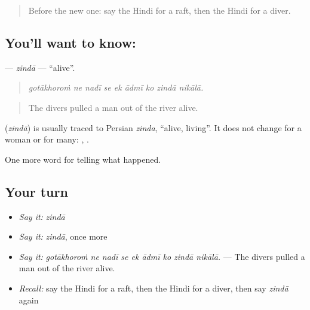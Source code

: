 \label{lesson:HI-C308-zinda}



\begin{quote}
Before the new one: say the Hindi for a raft, then the Hindi for a diver.
\end{quote}

\subsection*{You'll want to know: }
\textbf{} — \emph{zindā} — \textquotedblleft{}alive\textquotedblright{}.

\begin{quote}
        
\end{quote}

\begin{quote}
\emph{gotākhoroṁ ne nadī se ek ādmī ko zindā nikālā.}
\end{quote}

\begin{quote}
The divers pulled a man out of the river alive.
\end{quote}

\begin{cousinweb}
\textbf{} (\emph{zindā}) is usually traced to Persian \emph{zinda}, \textquotedblleft{}alive, living\textquotedblright{}. It does not change for a woman or for many: \textbf{  }, \textbf{  }.
\end{cousinweb}

\begin{grammarlens}[title={What you've built}]
One more word for telling what happened.
\end{grammarlens}

\subsection*{Your turn}
\begin{itemize}
\raggedright
  \item \emph{Say it:} \emph{zindā}
  \item \emph{Say it:} \emph{zindā}, once more
  \item \emph{Say it:} \emph{gotākhoroṁ ne nadī se ek ādmī ko zindā nikālā.} — The divers pulled a man out of the river alive.
  \item \emph{Recall:} say the Hindi for a raft, then the Hindi for a diver, then say \emph{zindā} again
\end{itemize}

